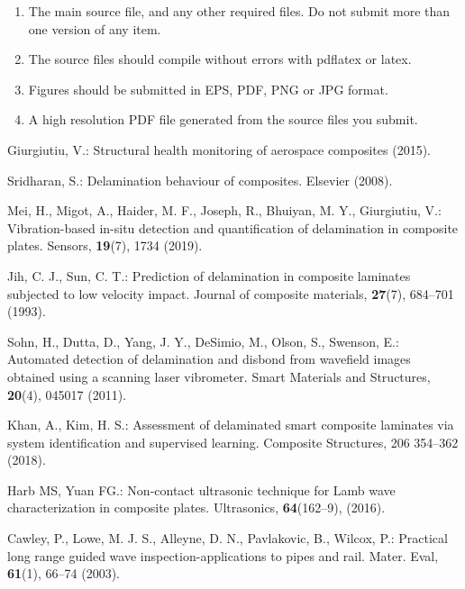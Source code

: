 \documentclass{IOS-Book-Article}
\begin{document}
\begin{enumerate}
\item The main source file, and any other required files. Do not submit more than
one version of any item.

\item The source files should compile without errors with pdflatex or latex.

\item Figures should be submitted in EPS, PDF, PNG or JPG format.

\item A high resolution PDF file generated from the source files you submit.
\end{enumerate}

\begin{thebibliography}{8}
	
	Giurgiutiu, V.: Structural health monitoring of aerospace composites (2015).
	
	Sridharan, S.: Delamination behaviour of composites. Elsevier (2008).
	
	Mei, H., Migot, A., Haider, M. F., Joseph, R., Bhuiyan, M. Y., Giurgiutiu, 
	V.: Vibration-based in-situ detection and quantification of delamination in 
	composite plates. Sensors, \textbf{19}(7), 1734 (2019).
	
	Jih, C. J., Sun, C. T.: Prediction of delamination in composite laminates 
	subjected to low velocity impact. Journal of composite materials, 
	\textbf{27}(7), 684--701 (1993).
	
	Sohn, H., Dutta, D., Yang, J. Y., DeSimio, M., Olson, S., Swenson, E.: 
	Automated detection of delamination and disbond from wavefield images obtained 
	using a scanning laser vibrometer. Smart Materials and Structures, 
	\textbf{20}(4), 
	045017 (2011).
	
	Khan, A., Kim, H. S.: Assessment of delaminated smart composite laminates via 
	system identification and supervised learning. Composite Structures, 206 
	354--362 (2018).
	
	Harb MS, Yuan FG.: Non-contact ultrasonic technique for Lamb wave 
	characterization in composite plates. Ultrasonics, \textbf{64}(162--9), (2016).
	
	Cawley, P., Lowe, M. J. S., Alleyne, D. N., Pavlakovic, B., Wilcox, P.: 
	Practical long range guided wave inspection-applications to pipes and rail. 
	Mater. Eval, \textbf{61}(1), 66--74 (2003).
	

\end{thebibliography}
\end{document}
